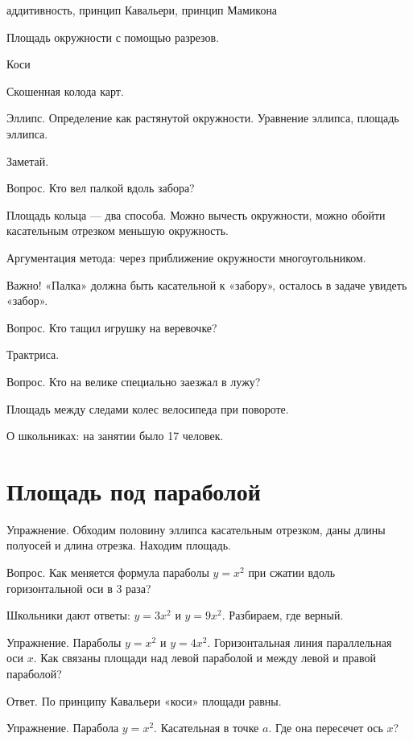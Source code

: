 \documentclass[12pt]{article}
\theoremstyle{definition}
\begin{document}
аддитивность, принцип Кавальери, принцип Мамикона

Площадь окружности с помощью разрезов. 


Коси

Скошенная колода карт.

Эллипс. Определение как растянутой окружности. Уравнение эллипса, площадь эллипса.

Заметай.

Вопрос. Кто вел палкой вдоль забора?

Площадь кольца — два способа. Можно вычесть окружности, можно обойти касательным отрезком меньшую окружность. 

Аргументация метода: через приближение окружности многоугольником.

Важно! «Палка» должна быть касательной к «забору», осталось в задаче увидеть «забор».


Вопрос. Кто тащил игрушку на веревочке?

Трактриса. 

Вопрос. Кто на велике специально заезжал в лужу?

Площадь между следами колес велосипеда при повороте. 

О школьниках: на занятии было 17 человек. 

\section{Площадь под параболой}

Упражнение. Обходим половину эллипса касательным отрезком, даны длины полуосей и длина отрезка. Находим площадь.

Вопрос. Как меняется формула параболы $y = x^2$ при сжатии вдоль горизонтальной оси в 3 раза?

Школьники дают ответы: $y=3x^2$ и $y=9x^2$. Разбираем, где верный. 

Упражнение. Параболы $y=x^2$ и $y=4x^2$. Горизонтальная линия параллельная оси $x$. 
Как связаны площади над левой параболой и между левой и правой параболой?

Ответ. По принципу Кавальери «коси» площади равны. 

Упражнение. Парабола $y=x^2$. Касательная в точке $a$. Где она пересечет ось $x$?
\end{document}
